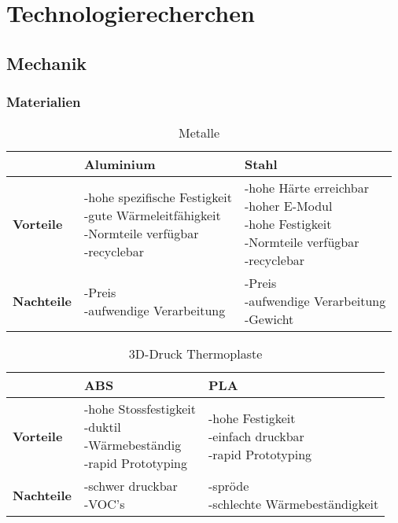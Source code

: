 \section{Technologierecherchen}

\subsection{Mechanik}

\subsubsection{Materialien}

\begin{table}[H]
\centering
\small
\begin{tabular}{|l|l|l|}
\hline
  \textbf{} & \textbf{Aluminium} & \textbf{Stahl} \\
  \hline
  \textbf{Vorteile}  & \makecell{-hohe spezifische Festigkeit\\ -gute Wärmeleitfähigkeit \\ -Normteile verfügbar \\ -recyclebar} & \makecell{-hohe Härte erreichbar \\-hoher E-Modul\\-hohe Festigkeit \\ -Normteile verfügbar\\ -recyclebar}\\ 
  \hline
  \textbf{Nachteile} & \makecell{-Preis \\ -aufwendige Verarbeitung \\} & \makecell{-Preis\\-aufwendige Verarbeitung \\ -Gewicht}\\
  \hline
\end{tabular}
\caption{Metalle}
\label{table:metals-comparison}
\end{table}


\begin{table}[H]
\centering
\small
\begin{tabular}{|l|l|l|}
\hline
  \textbf{} & \textbf{ABS} & \textbf{PLA} \\
  \hline
  \textbf{Vorteile}  & \makecell{-hohe Stossfestigkeit\\ -duktil \\ -Wärmebeständig \\ -rapid Prototyping} & \makecell{-hohe Festigkeit \\-einfach druckbar\\ -rapid Prototyping}\\
  \hline
  \textbf{Nachteile} & \makecell{-schwer druckbar \\ -VOC's  \\} & \makecell{-spröde\\-schlechte Wärmebeständigkeit}\\
  \hline
\end{tabular}
\caption{3D-Druck Thermoplaste}
\label{table:fdm-thermoplasts-comparison}
\end{table}


